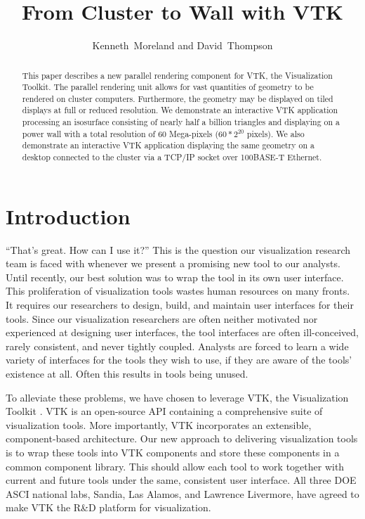 \documentclass[twocolumn]{article}
\title{From Cluster to Wall with VTK}
\author{Kenneth~Moreland and David~Thompson}
\begin{document}
  \maketitle

  \begin{abstract}
    This paper describes a new parallel rendering component for VTK, the
    Visualization Toolkit.  The parallel rendering unit allows for vast
    quantities of geometry to be rendered on cluster computers.
    Furthermore, the geometry may be displayed on tiled displays at full or
    reduced resolution.  We demonstrate an interactive VTK application
    processing an isosurface consisting of nearly half a billion triangles
    and displaying on a power wall with a total resolution of 60
    Mega-pixels ($60*2^{20}$ pixels).  We also demonstrate an interactive
    VTK application displaying the same geometry on a desktop connected to
    the cluster via a TCP/IP socket over 100BASE-T Ethernet.
  \end{abstract}

  \section{Introduction}
  \label{sec:introduction}

  ``That's great.  How can I use it?''  This is the question our
  visualization research team is faced with whenever we present a promising
  new tool to our analysts.  Until recently, our best solution was to wrap
  the tool in its own user interface.  This proliferation of visualization
  tools wastes human resources on many fronts.  It requires our researchers
  to design, build, and maintain user interfaces for their tools.  Since
  our visualization researchers are often neither motivated nor experienced
  at designing user interfaces, the tool interfaces are often
  ill-conceived, rarely consistent, and never tightly coupled.  Analysts
  are forced to learn a wide variety of interfaces for the tools they wish
  to use, if they are aware of the tools' existence at all.  Often this
  results in tools being unused.

  To alleviate these problems, we have chosen to leverage VTK, the
  Visualization Toolkit \cite{Schroeder98}.  VTK is an open-source API
  containing a comprehensive suite of visualization tools.  More
  importantly, VTK incorporates an extensible, component-based
  architecture.  Our new approach to delivering visualization tools is to
  wrap these tools into VTK components and store these components in a
  common component library.  This should allow each tool to work together
  with current and future tools under the same, consistent user interface.
  All three DOE ASCI national labs, Sandia, Las Alamos, and Lawrence
  Livermore, have agreed to make VTK the R\&D platform for visualization.
\end{document}
